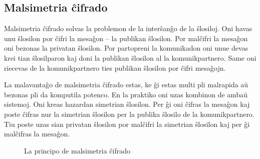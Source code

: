 \documentclass[utf8]{scrartcl}
\begin{document}
\subsection{Malsimetria ĉifrado}

Malsimetria ĉifrado solvas la problemon de la interŝanĝo de la ŝlosiloj. Oni
havas unu ŝlosilon por ĉifri la mesaĝon – la publikan ŝlosilon. Por malĉifri la
mesaĝon oni bezonas la privatan ŝlosilon.  Por partopreni la komunikadon oni
unue devas krei tian ŝlosilparon kaj doni la publikan ŝlosilon al la
komunikpartnero.  Same oni riecevas de la komunikpartnero ties publikan
ŝlosilon por ĉifri mesaĝojn.

La malavantaĝo de malsimetria ĉifrado estas, ke ĝi estas multi pli malrapida aŭ
bezonas pli da komputila potenco.  En la praktiko oni uzas kombinon de ambaŭ
sistemoj. Oni kreas hazardan simetrian ŝlosilon. Per ĝi oni ĉifras la mesaĝon
kaj poste ĉifras nur la simetrian ŝlosilon per la publika ŝlosilo de la
komunikpartnero.  Tiu poste uzas sian privatan ŝlosilon por malĉifri la
simetrian ŝlosilon kaj per ĝi malĉifras la mesaĝon.
%
\begin{figure}
  \caption{La principo de malsimetria ĉifrado}
\end{figure}
\end{document}
